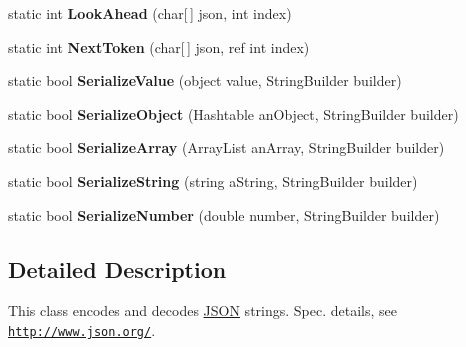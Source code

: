 \begin{DoxyCompactItemize}
\item 
\hypertarget{classProcurios_1_1Public_1_1JSON_a94c3a5193fac38f9b6648404ebb6b86a}{static int {\bfseries \-Look\-Ahead} (char\mbox{[}$\,$\mbox{]} json, int index)}\label{classProcurios_1_1Public_1_1JSON_a94c3a5193fac38f9b6648404ebb6b86a}

\item 
\hypertarget{classProcurios_1_1Public_1_1JSON_ae3bf55097865718de308e0407aea2191}{static int {\bfseries \-Next\-Token} (char\mbox{[}$\,$\mbox{]} json, ref int index)}\label{classProcurios_1_1Public_1_1JSON_ae3bf55097865718de308e0407aea2191}

\item 
\hypertarget{classProcurios_1_1Public_1_1JSON_a85b20488d5e89f5d5570dcf7ff045a64}{static bool {\bfseries \-Serialize\-Value} (object value, \-String\-Builder builder)}\label{classProcurios_1_1Public_1_1JSON_a85b20488d5e89f5d5570dcf7ff045a64}

\item 
\hypertarget{classProcurios_1_1Public_1_1JSON_afcd742a1caed7b8df34868cab7faaf7e}{static bool {\bfseries \-Serialize\-Object} (\-Hashtable an\-Object, \-String\-Builder builder)}\label{classProcurios_1_1Public_1_1JSON_afcd742a1caed7b8df34868cab7faaf7e}

\item 
\hypertarget{classProcurios_1_1Public_1_1JSON_a720d9cc6239bc4c5b137baf947014ed6}{static bool {\bfseries \-Serialize\-Array} (\-Array\-List an\-Array, \-String\-Builder builder)}\label{classProcurios_1_1Public_1_1JSON_a720d9cc6239bc4c5b137baf947014ed6}

\item 
\hypertarget{classProcurios_1_1Public_1_1JSON_aac24706b51664ac548cf247cc6facdeb}{static bool {\bfseries \-Serialize\-String} (string a\-String, \-String\-Builder builder)}\label{classProcurios_1_1Public_1_1JSON_aac24706b51664ac548cf247cc6facdeb}

\item 
\hypertarget{classProcurios_1_1Public_1_1JSON_a0d383eeaab649ef0c1281132776d5630}{static bool {\bfseries \-Serialize\-Number} (double number, \-String\-Builder builder)}\label{classProcurios_1_1Public_1_1JSON_a0d383eeaab649ef0c1281132776d5630}

\end{DoxyCompactItemize}


\subsection{\-Detailed \-Description}
\-This class encodes and decodes \hyperlink{classProcurios_1_1Public_1_1JSON}{\-J\-S\-O\-N} strings. \-Spec. details, see \href{http://www.json.org/}{\tt http\-://www.\-json.\-org/}. 

